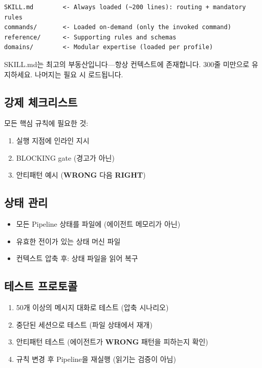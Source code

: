 \documentclass[11pt,a4paper,openright,twoside]{report}
\newcommand{\wrong}{\textcolor{specred}{\textbf{WRONG}}}
\newcommand{\rightlabel}{\textcolor{specgreen}{\textbf{RIGHT}}}
\begin{document}
\begin{lstlisting}[title={Recommended Skill Structure}]
SKILL.md        <- Always loaded (~200 lines): routing + mandatory rules
commands/       <- Loaded on-demand (only the invoked command)
reference/      <- Supporting rules and schemas
domains/        <- Modular expertise (loaded per profile)
\end{lstlisting}

SKILL.md는 최고의 부동산입니다---항상 컨텍스트에 존재합니다. 300줄 미만으로 유지하세요. 나머지는 필요 시 로드됩니다.

\subsection{강제 체크리스트}

모든 핵심 규칙에 필요한 것:
\begin{enumerate}
  \item 실행 지점에 인라인 지시
  \item BLOCKING gate (경고가 아닌)
  \item 안티패턴 예시 (\wrong{} 다음 \rightlabel{})
\end{enumerate}

\subsection{상태 관리}

\begin{itemize}
  \item 모든 Pipeline 상태를 파일에 (에이전트 메모리가 아닌)
  \item 유효한 전이가 있는 상태 머신 파일
  \item 컨텍스트 압축 후: 상태 파일을 읽어 복구
\end{itemize}

\subsection{테스트 프로토콜}

\begin{enumerate}
  \item 50개 이상의 메시지 대화로 테스트 (압축 시나리오)
  \item 중단된 세션으로 테스트 (파일 상태에서 재개)
  \item 안티패턴 테스트 (에이전트가 \wrong{} 패턴을 피하는지 확인)
  \item 규칙 변경 후 Pipeline을 재실행 (읽기는 검증이 아님)
\end{enumerate}
\end{document}
